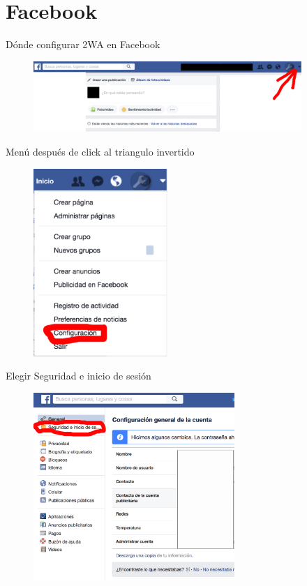 \documentclass[11pt]{beamer}
\begin{document}
\section{Facebook}
\begin{frame}{D\'onde configurar 2WA en Facebook}
  \begin{figure}
    \includegraphics[width=4in]{images/donde-facebook.png}
  \end{figure}
\end{frame}
\begin{frame}{Men\'u despu\'es de click al triangulo invertido}
  \begin{figure}
    \includegraphics[width=2in]{images/facebook-menu.png}
  \end{figure}
\end{frame}
\begin{frame}{Elegir Seguridad e inicio de sesi\'on}
  \begin{figure}
    \includegraphics[width=3in]{images/seguridad-iniciodesesion.png}
  \end{figure}
\end{frame}
\end{document}
